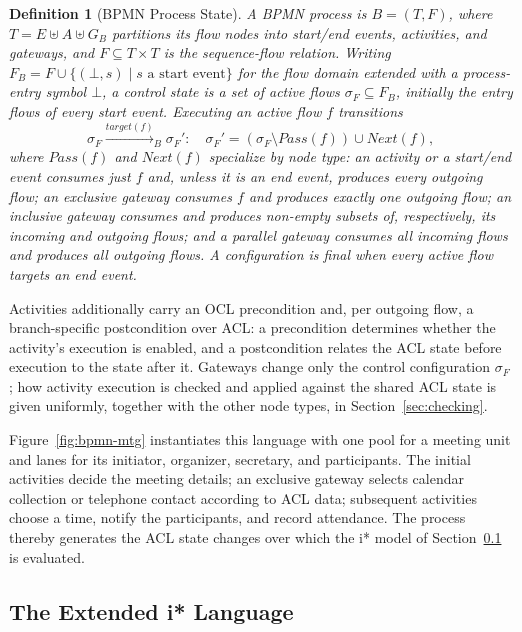 \documentclass[a4paper, conference]{IEEEtran}
\newtheorem{definition}{Definition}
\begin{document}
\begin{definition}[BPMN Process State]
\label{def:bpmn-model}
A BPMN process is $B=(T,F)$, where $T=E\uplus A\uplus G_B$ partitions its flow nodes into start/end events, activities, and gateways, and $F\subseteq T\times T$ is the sequence-flow relation. Writing $F_B=F\cup\{(\bot,s)\mid s\text{ a start event}\}$ for the flow domain extended with a process-entry symbol $\bot$, a control state is a set of active flows $\sigma_F\subseteq F_B$, initially the entry flows of every start event. Executing an active flow $f$ transitions
\[
\sigma_F \xrightarrow{\mathit{target}(f)}_B \sigma_F': \quad \sigma_F' = (\sigma_F\setminus \mathit{Pass}(f)) \cup \mathit{Next}(f),
\]
where $\mathit{Pass}(f)$ and $\mathit{Next}(f)$ specialize by node type: an activity or a start/end event consumes just $f$ and, unless it is an end event, produces every outgoing flow; an exclusive gateway consumes $f$ and produces exactly one outgoing flow; an inclusive gateway consumes and produces non-empty subsets of, respectively, its incoming and outgoing flows; and a parallel gateway consumes all incoming flows and produces all outgoing flows. A configuration is final when every active flow targets an end event.
\end{definition}

Activities additionally carry an OCL precondition and, per outgoing flow, a branch-specific postcondition over ACL: a precondition determines whether the activity's execution is enabled, and a postcondition relates the ACL state before execution to the state after it. Gateways change only the control configuration $\sigma_F$; how activity execution is checked and applied against the shared ACL state is given uniformly, together with the other node types, in Section~\ref{sec:checking}.

Figure~\ref{fig:bpmn-mtg} instantiates this language with one pool for a meeting unit and lanes for its initiator, organizer, secretary, and participants. The initial activities decide the meeting details; an exclusive gateway selects calendar collection or telephone contact according to ACL data; subsequent activities choose a time, notify the participants, and record attendance. The process thereby generates the ACL state changes over which the i* model of Section~\ref{sec:istar} is evaluated.

\subsection{The Extended i* Language}
\label{sec:istar}
\end{document}
